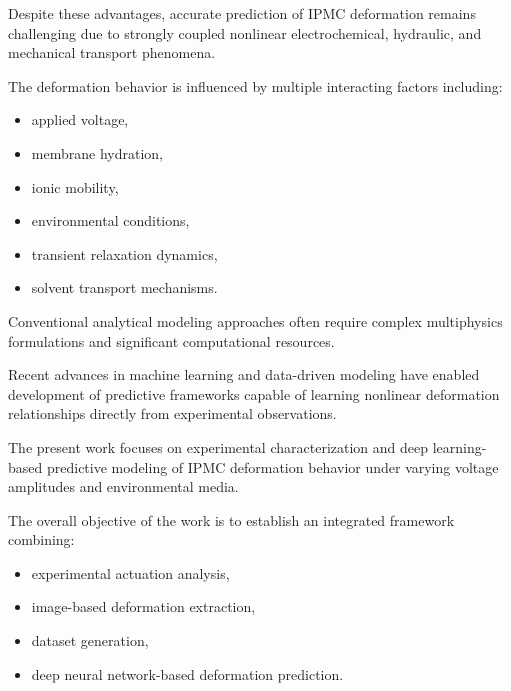 \documentclass[11pt,a4paper]{article}
\begin{document}
Despite these advantages, accurate prediction of IPMC deformation remains challenging due to strongly coupled nonlinear electrochemical, hydraulic, and mechanical transport phenomena.

The deformation behavior is influenced by multiple interacting factors including:

\begin{itemize}

\item applied voltage,

\item membrane hydration,

\item ionic mobility,

\item environmental conditions,

\item transient relaxation dynamics,

\item solvent transport mechanisms.

\end{itemize}

Conventional analytical modeling approaches often require complex multiphysics formulations and significant computational resources.

Recent advances in machine learning and data-driven modeling have enabled development of predictive frameworks capable of learning nonlinear deformation relationships directly from experimental observations.

The present work focuses on experimental characterization and deep learning-based predictive modeling of IPMC deformation behavior under varying voltage amplitudes and environmental media.

The overall objective of the work is to establish an integrated framework combining:

\begin{itemize}

\item experimental actuation analysis,

\item image-based deformation extraction,

\item dataset generation,

\item deep neural network-based deformation prediction.

\end{itemize}
\end{document}
